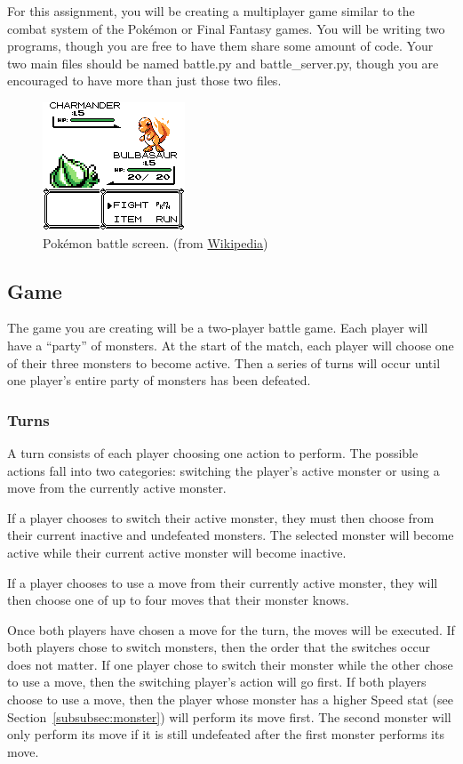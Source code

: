 \documentclass[11pt]{cselabheader}
\begin{document}
For this assignment, you will be creating a multiplayer game similar to the
combat system of the Pok\'emon or Final Fantasy games. You will be writing
two programs, though you are free to have them share some amount of code.
Your two main files should be named battle.py and battle\_server.py, though
you are encouraged to have more than just those two files.

\begin{figure}[h]
  \centering
  \includegraphics{img/Bulbasaur_pokemon_red}
  \caption{Pok\'emon battle screen. (from
    \href{http://en.wikipedia.org/wiki/File:Bulbasaur_pokemon_red.png}{Wikipedia})}
  \label{poke}
\end{figure}

\subsection{Game}
The game you are creating will be a two-player battle game. Each player will
have a ``party'' of monsters. At the start of the match, each player will choose
one of their three monsters to become active. Then a series of turns will occur
until one player's entire party of monsters has been defeated.

\subsubsection{Turns}
\label{subsubsec:turn}
A turn consists of each player choosing one action to perform. The possible
actions fall into two categories: switching the player's active monster or using
a move from the currently active monster.

If a player chooses to switch their active monster, they must then choose from
their current inactive and undefeated monsters. The selected monster will become
active while their current active monster will become inactive.

If a player chooses to use a move from their currently active monster, they will
then choose one of up to four moves that their monster knows.

Once both players have chosen a move for the turn, the moves will be executed.
If both players chose to switch monsters, then the order that the switches occur
does not matter. If one player chose to switch their monster while the other chose
to use a move, then the switching player's action will go first. If both players
choose to use a move, then the player whose monster has a higher Speed stat (see
Section~\ref{subsubsec:monster}) will perform its move first. The second monster
will only perform its move if it is still undefeated after the first monster
performs its move.
\end{document}

